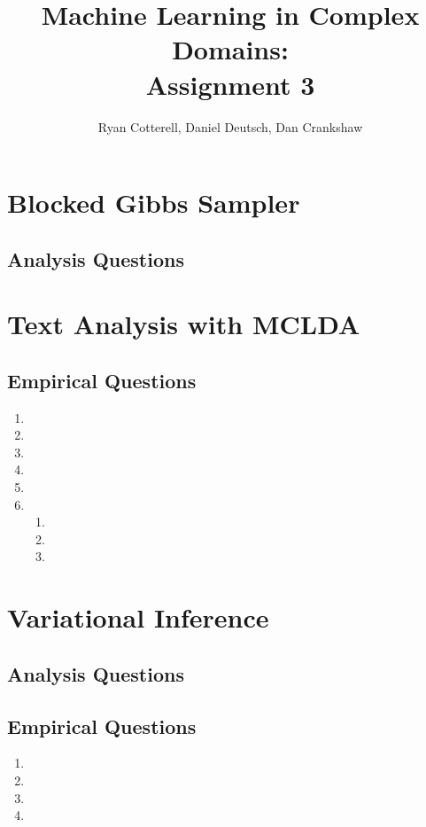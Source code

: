 \documentclass[11pt,a4paper]{article}
\title{Machine Learning in Complex Domains:\\Assignment 3}
\author{Ryan Cotterell, Daniel Deutsch, Dan Crankshaw}
\date{}
\begin{document}
	\maketitle
	
	\setcounter{section}{3}
	\section{Blocked Gibbs Sampler}
	\subsection{Analysis Questions}
	
	\section{Text Analysis with MCLDA}
	\subsection{Empirical Questions}
	\begin{enumerate}
		\item 
		\item 
		\item
		\item
		\item
		\item \begin{enumerate}
			\item 
			\item 
			\item 
		\end{enumerate}
	\end{enumerate}
	
	\section{Variational Inference}
	\subsection{Analysis Questions}
	
	\setcounter{subsection}{2}
	\subsection{Empirical Questions}
	\begin{enumerate}
		\item 
		\item
		\item
		\item
	\end{enumerate}
\end{document}
